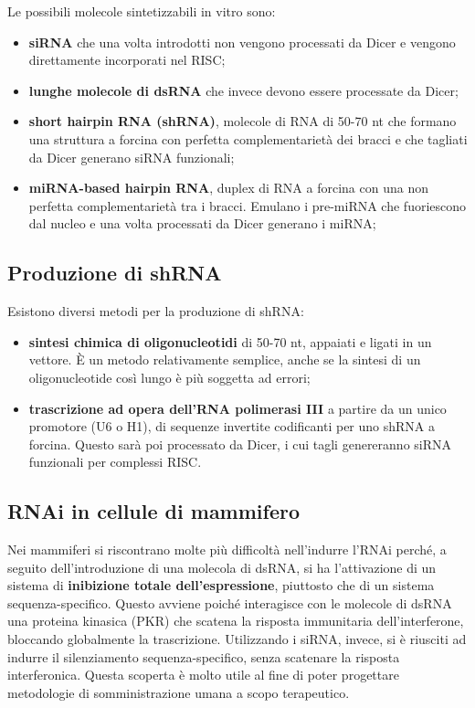 \documentclass[11pt]{book}
\begin{document}
Le possibili molecole sintetizzabili in vitro sono:

\begin{itemize}
\itemsep1pt\parskip0pt
\item
  \textbf{siRNA} che una volta introdotti non vengono processati da
  Dicer e vengono direttamente incorporati nel RISC;
\item
  \textbf{lunghe molecole di dsRNA} che invece devono essere processate
  da Dicer;
\item
  \textbf{short hairpin RNA (shRNA)}, molecole di RNA di 50-70 nt che
  formano una struttura a forcina con perfetta complementarietà dei
  bracci e che tagliati da Dicer generano siRNA funzionali;
\item
  \textbf{miRNA-based hairpin RNA}, duplex di RNA a forcina con una non
  perfetta complementarietà tra i bracci. Emulano i pre-miRNA che
  fuoriescono dal nucleo e una volta processati da Dicer generano i
  miRNA;
\end{itemize}

\subsection{Produzione di shRNA}\label{produzione-di-shrna}

Esistono diversi metodi per la produzione di shRNA:

\begin{itemize}
\itemsep1pt\parskip0pt
\item
  \textbf{sintesi chimica di oligonucleotidi} di 50-70 nt, appaiati e
  ligati in un vettore. È un metodo relativamente semplice, anche se la
  sintesi di un oligonucleotide così lungo è più soggetta ad errori;
\item
  \textbf{trascrizione ad opera dell'RNA polimerasi III} a partire da un
  unico promotore (U6 o H1), di sequenze invertite codificanti per uno
  shRNA a forcina. Questo sarà poi processato da Dicer, i cui tagli
  genereranno siRNA funzionali per complessi RISC.
\end{itemize}

\subsection{RNAi in cellule di
mammifero}\label{rnai-in-cellule-di-mammifero}

Nei mammiferi si riscontrano molte più difficoltà nell'indurre l'RNAi
perché, a seguito dell'introduzione di una molecola di dsRNA, si ha
l'attivazione di un sistema di \textbf{inibizione totale
dell'espressione}, piuttosto che di un sistema sequenza-specifico.
Questo avviene poiché interagisce con le molecole di dsRNA una proteina
kinasica (PKR) che scatena la risposta immunitaria dell'interferone,
bloccando globalmente la trascrizione. Utilizzando i siRNA, invece, si è
riusciti ad indurre il silenziamento sequenza-specifico, senza scatenare
la risposta interferonica. Questa scoperta è molto utile al fine di
poter progettare metodologie di somministrazione umana a scopo
terapeutico.
\end{document}

